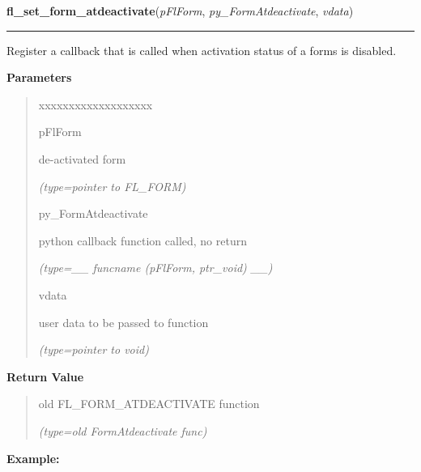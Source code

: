 \hspace{.8\funcindent}\begin{boxedminipage}{\funcwidth}

    \raggedright \textbf{fl\_set\_form\_atdeactivate}(\textit{pFlForm}, \textit{py\_FormAtdeactivate}, \textit{vdata})

    \vspace{-1.5ex}

    \rule{\textwidth}{0.5\fboxrule}
\setlength{\parskip}{2ex}
    Register a callback that is called when activation status of a forms is
    disabled.

\setlength{\parskip}{1ex}
      \textbf{Parameters}
      \vspace{-1ex}

      \begin{quote}
        \begin{Ventry}{xxxxxxxxxxxxxxxxxxx}

          \item[pFlForm]

          de-activated form

            {\it (type=pointer to FL\_FORM)}

          \item[py\_FormAtdeactivate]

          python callback function called, no return

            {\it (type=\_\_ funcname (pFlForm, ptr\_void) \_\_)}

          \item[vdata]

          user data to be passed to function

            {\it (type=pointer to void)}

        \end{Ventry}

      \end{quote}

      \textbf{Return Value}
    \vspace{-1ex}

      \begin{quote}
      old FL\_FORM\_ATDEACTIVATE function

      {\it (type=old FormAtdeactivate func)}

      \end{quote}

\textbf{Example:}
\begin{quote}
  \begin{itemize}


\end{itemize}
\end{quote}
\end{boxedminipage}
